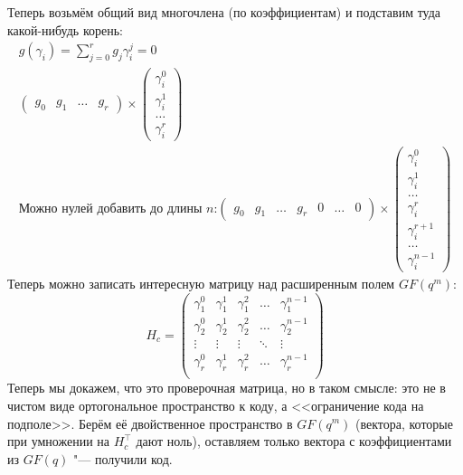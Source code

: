 Теперь возьмём общий вид многочлена (по коэффициентам) и подставим туда какой-нибудь корень:
\begin{gather*}
g(\gamma_i) = \sum\limits_{j=0}^r g_j \gamma_i^j = 0
\\
\begin{pmatrix}
g_0 & g_1 & \dots & g_r
\end{pmatrix}
\times
\begin{pmatrix}
\gamma_i^0 \\ \gamma_i^1 \\ \dots \\ \gamma_i^r
\end{pmatrix}
\\
\text{Можно нулей добавить до длины $n$:}
\begin{pmatrix}
g_0 & g_1 & \dots & g_r & 0 & \dots & 0
\end{pmatrix}
\times
\begin{pmatrix}
\gamma_i^0 \\ \gamma_i^1 \\ \dots \\ \gamma_i^r \\ \gamma_i^{r+1} \\ \dots \\ \gamma_i^{n-1}
\end{pmatrix}
\end{gather*}
Теперь можно записать интересную матрицу над расширенным полем $GF(q^m)$:
\[
H_c = \begin{pmatrix}
\gamma_1^0 & \gamma_1^1 & \gamma_1^2 & \dots & \gamma_1^{n-1} \\
\gamma_2^0 & \gamma_2^1 & \gamma_2^2 & \dots & \gamma_2^{n-1} \\
\vdots & \vdots & \vdots & \ddots & \vdots \\
\gamma_r^0 & \gamma_r^1 & \gamma_r^2 & \dots & \gamma_r^{n-1} \\
\end{pmatrix}
\]
Теперь мы докажем, что это проверочная матрица, но в таком смысле:
это не в чистом виде ортогональное пространство к коду,
а <<ограничение кода на подполе>>.
Берём её двойственное пространство в $GF(q^m)$ (вектора, которые при умножении
на $H_c^\top$ дают ноль), оставляем только вектора с коэффициентами из $GF(q)$ "--- получили код.

